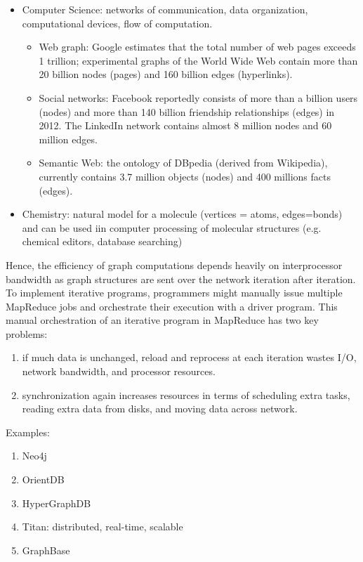 \begin{itemize}
  \item Computer Science: networks of communication, data organization, computational devices, flow of computation.
  
\begin{itemize}
  \item Web graph: Google estimates that the total number of web pages exceeds 1 trillion;
experimental graphs of the World Wide Web contain more than 20 billion nodes
(pages) and 160 billion edges (hyperlinks).
  
  \item Social networks: Facebook reportedly consists of more than a billion
  users (nodes) and more than 140 billion friendship relationships (edges) in
  2012. The LinkedIn network contains almost 8 million nodes and 60 million
  edges.
  
  \item Semantic Web:  the ontology of DBpedia (derived from Wikipedia),
  currently contains 3.7 million objects (nodes) and 400 millions facts (edges).
\end{itemize}
  
  \item Chemistry: natural model for a molecule (vertices = atoms, edges=bonds)
  and can be used iin computer processing of molecular structures (e.g. chemical editors, database searching)
  
\end{itemize}

 
Hence, the efficiency of graph computations depends heavily on interprocessor
bandwidth as graph structures are sent over the network iteration after
iteration.  To implement iterative programs, programmers might manually issue
multiple MapReduce jobs and orchestrate their execution with a driver program.
This manual orchestration of an iterative program in MapReduce has two key
problems: 
\begin{enumerate}
  \item if much data is unchanged, reload and reprocess at each iteration wastes
  I/O, network bandwidth, and processor resources.
  
  \item synchronization again increases resources in terms of scheduling extra
  tasks, reading extra data from disks, and moving data across network.
\end{enumerate}


Examples:
\begin{enumerate}
  \item Neo4j
  \item OrientDB
  \item HyperGraphDB
  \item Titan: distributed, real-time, scalable 
  \item GraphBase
  
\end{enumerate}

